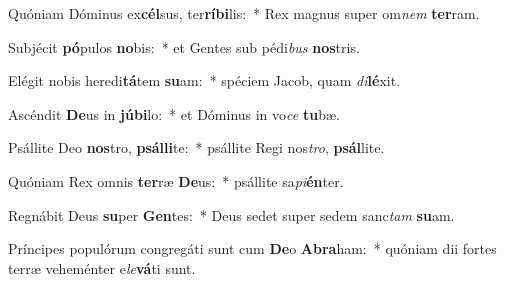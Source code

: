 \item Quóniam Dóminus ex\textbf{cél}sus, ter\textbf{rí}\textbf{bi}lis:~* Rex magnus super om\textit{nem} \textbf{ter}ram.
\item Subjécit \textbf{pó}pulos \textbf{no}bis:~* et Gentes sub pédi\textit{bus} \textbf{nos}tris.
\item Elégit nobis heredi\textbf{tá}tem \textbf{su}am:~* spéciem Jacob, quam \textit{di}\textbf{lé}xit.
\item Ascéndit \textbf{De}us in \textbf{jú}\textbf{bi}lo:~* et Dóminus in vo\textit{ce} \textbf{tu}bæ.
\item Psállite Deo \textbf{nos}tro, \textbf{psál}\textbf{li}te:~* psállite Regi nos\textit{tro}, \textbf{psál}lite.
\item Quóniam Rex omnis \textbf{ter}ræ \textbf{De}us:~* psállite sa\textit{pi}\textbf{én}ter.
\item Regnábit Deus \textbf{su}per \textbf{Gen}tes:~* Deus sedet super sedem sanc\textit{tam} \textbf{su}am.
\item Príncipes populórum congregáti sunt cum \textbf{De}o \textbf{A}\textbf{bra}ham:~* quóniam dii fortes terræ veheménter e\textit{le}\textbf{vá}ti sunt.
